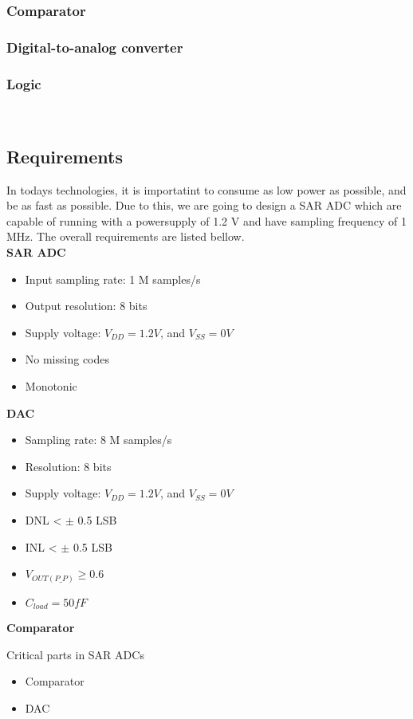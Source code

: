 \documentclass[english, 12pt, a4paper]{article}
\begin{document}
\subsubsection{Comparator}

\subsubsection{Digital-to-analog converter}
\subsubsection{Logic}
\
\subsection{Requirements}
In todays technologies, it is importatint to consume as low power as possible, and be as fast as possible. Due to this, we are going to design a SAR ADC which are capable 
of running with a powersupply of 1.2 V and have sampling frequency of 1 MHz. The overall requirements are listed bellow.\\
\textbf{SAR ADC}
\begin{itemize}
 \item Input sampling rate: 1 M samples/s
 \item Output resolution: 8 bits
 \item Supply voltage: $V_{DD} = 1.2 V$, and $V_{SS} = 0 V$
 \item No missing codes
 \item Monotonic
\end{itemize}
\textbf{DAC}
\begin{itemize}
 \item Sampling rate: 8 M samples/s
 \item Resolution: 8 bits
 \item Supply voltage: $V_{DD} = 1.2 V$, and $V_{SS} = 0 V$
 \item DNL < $\pm$ 0.5 LSB
 \item INL < $\pm$ 0.5 LSB
 \item $V_{OUT(P\_P)} \geq 0.6$
 \item $C_{load} = 50 fF$
\end{itemize}

\textbf{Comparator}


Critical parts in SAR ADCs 

\begin{itemize}
 \item Comparator
 \item DAC
\end{itemize}
\end{document}
